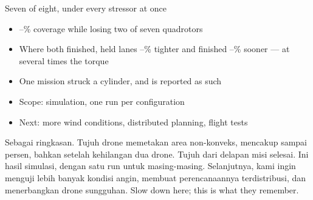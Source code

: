 \documentclass[aspectratio=169,11pt,t]{beamer}
\begin{document}
\begin{frame}{Seven of eight, under every stressor at once}
  \begin{itemize}\bulletgap
    \item \CovMin--\CovMax\% coverage while losing two of seven quadrotors
    \item Where both finished, \hinf{} held lanes \LatRedMin--\LatRedMax\%
          tighter and finished \TimeRedMin--\TimeRedMax\% sooner --- at
          several times the torque
    \item One \lqr{} mission struck a cylinder, and is reported as such
    \item Scope: simulation, one run per configuration
    \item Next: more wind conditions, distributed planning, flight tests
  \end{itemize}
    {Sebagai ringkasan. Tujuh drone memetakan area non-konveks, mencakup \CovMin\space sampai \CovMax\space persen, bahkan setelah kehilangan dua drone. Tujuh dari delapan misi selesai. Ini hasil simulasi, dengan satu run untuk masing-masing. Selanjutnya, kami ingin menguji lebih banyak kondisi angin, membuat perencanaannya terdistribusi, dan menerbangkan drone sungguhan.}
    {Slow down here; this is what they remember.}
\end{frame}
\end{document}
